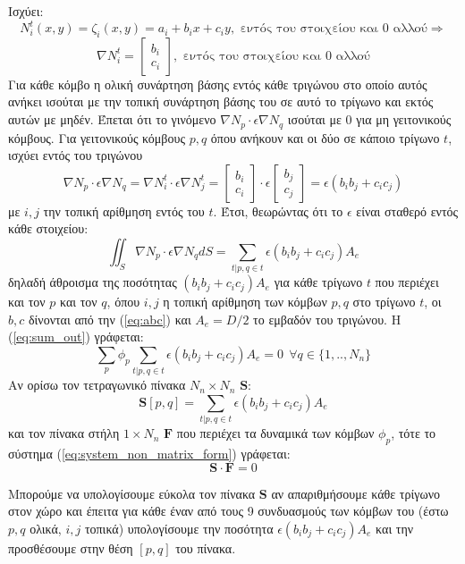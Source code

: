\documentclass[10pt, letterpaper]{article}
\begin{document}
Ισχύει:
\[ N_i^t (x,y) =  \zeta_i(x,y) = a_i + b_ix + c_iy, \text{\ εντός του στοιχείου και $0$ αλλού}\Rightarrow\]
\[ \nabla N_i^t =   
    \begin{bmatrix}
        b_i \\
        c_i
    \end{bmatrix}
                    , \text{\ εντός του στοιχείου και $0$ αλλού}\]
Για κάθε κόμβο η ολική συνάρτηση βάσης εντός κάθε τριγώνου στο οποίο αυτός ανήκει ισούται με 
την τοπική συνάρτηση βάσης του σε αυτό το τρίγωνο και εκτός αυτών με μηδέν.
Έπεται ότι το γινόμενο $\nabla N_p \cdot \epsilon \nabla N_q$ ισούται με $0$ για μη γειτονικούς κόμβους. Για γειτονικούς κόμβους $p,q$ όπου 
ανήκουν και οι δύο σε κάποιο 
τρίγωνο $t$, ισχύει εντός του τριγώνου
\[ \nabla N_p  \cdot \epsilon \nabla N_q  = \nabla N_i^t \cdot \epsilon \nabla N_j^t = 
    \begin{bmatrix}
        b_i \\
        c_i
    \end{bmatrix}
      \cdot \epsilon
    \begin{bmatrix}
        b_j \\
        c_j        
    \end{bmatrix}
    =  \epsilon (b_ib_j + c_ic_j)
\]
με $i,j$ την τοπική αρίθμηση εντός του $t$. Έτσι, θεωρώντας ότι το $\epsilon$ είναι σταθερό εντός κάθε στοιχείου:
\begin{equation} \label{eq:int_of_grad_Np_Nq_}
  \iint_S \nabla N_p  \cdot \epsilon \nabla N_q  dS = \sum_{t | p,q \in t} \epsilon (b_ib_j + c_ic_j) A_e 
\end{equation}
δηλαδή άθροισμα της ποσότητας $(b_ib_j + c_ic_j) A_e $ για κάθε τρίγωνο $t$ που περιέχει και τον $p$ και τον $q$, 
όπου $i,j$ η τοπική αρίθμηση των κόμβων $p,q$ στο τρίγωνο $t$, οι $b,c$ δίνονται από την (\ref{eq:abc}) και $A_e = D/2$ το εμβαδόν του τριγώνου.
Η (\ref{eq:sum_out}) γράφεται:
\begin{equation}  \label{eq:system_non_matrix_form}
  \sum_p  \phi_p \sum_{t | p,q \in t} \epsilon (b_ib_j + c_ic_j) A_e  = 0   \ \ \forall q \in \{1,..,N_n\}
\end{equation}
Αν ορίσω τον τετραγωνικό πίνακα $N_n \times N_n$ $\mathbf{S}$:
\[ \mathbf{S}[p,q] =  \sum_{t | p,q \in t} \epsilon (b_ib_j + c_ic_j) A_e  \]
και τον πίνακα στήλη $1 \times N_n$ $\mathbf{F}$ που περιέχει τα δυναμικά των κόμβων $\phi_p$, τότε το σύστημα (\ref{eq:system_non_matrix_form}) γράφεται:
\[ \mathbf{S} \cdot \mathbf{F} = 0 \]

Μπορούμε να υπολογίσουμε εύκολα τον πίνακα $\mathbf{S}$ αν απαριθμήσουμε κάθε τρίγωνο στον χώρο και έπειτα για κάθε έναν από τους
9 συνδυασμούς των κόμβων του (έστω $p,q$ ολικά, $i,j$ τοπικά) υπολογίσουμε την ποσότητα $\epsilon (b_ib_j + c_ic_j) A_e$ και την προσθέσουμε στην θέση $[p,q]$ του πίνακα.
\end{document}
